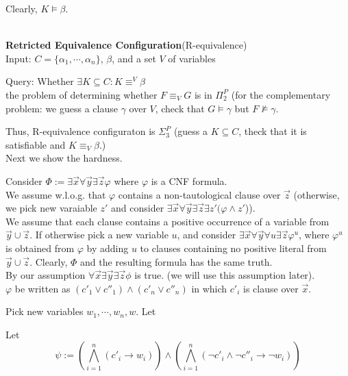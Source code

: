 \documentclass[12pt]{article}
\begin{document}
Clearly, $K\models\beta$. 




\ \\

{\bf Retricted Equivalence Configuration}(R-equivalence)\\

Input: $C=\{\alpha_1,\cdots,\alpha_n\}$, $\beta$, and a set $V$ of variables

Query: Whether $\exists K\subseteq C: K\equiv^V \beta$\\ 



the problem of determining whether $F\equiv_V G$  is in $\Pi_2^P$ (for the complementary problem: we guess a clause $\gamma$ over $V$, check that $G\models \gamma$ but $F\not\models \gamma$. 

Thus, R-equivalence configuraton is $\Sigma_3^P$ (guess a $K\subseteq C$, theck that it is satisfiable and $K\equiv_V \beta$.) \\


Next we show the hardness.

Consider $\Phi:=\exists \vec{x}\forall\vec{y}\exists \vec{z} \varphi$ where $\varphi$ is a CNF formula. \\

We assume w.l.o.g. that $\varphi$ contains a non-tautological clause over $\vec{z}$ (otherwise, we pick new varaiable $z'$ and consider $\exists\vec{x}\forall\vec{y}\exists\vec{z}\exists z'(\varphi\wedge z'$)).\\

We assume that each clause contains a positive occurrence of a variable from $\vec{y}\cup\vec{z}$. If otherwise pick a new variable $u$, and consider $\exists \vec{x}\forall\vec{y}\forall u\exists \vec{z}\varphi^u$, where $\varphi^u$ is obtained from $\varphi$ by adding $u$ to clauses containing no positive literal from $\vec{y}\cup\vec{z}$. Clearly, $\Phi$ and the resulting formula has the same truth.\\

By our assumption $\forall\vec{x}\exists\vec{y}\exists\vec{z}\phi$ is true. (we will use this assumption later).\\ 

$\varphi$ be written as $(c'_1\vee c''_1)\wedge (c'_n\vee c''_n)$ in which $c'_i$ is clause over $\vec{x}$.

Pick new variables $w_1, \cdots, w_n,w$. Let 

Let $$\psi:= \left(\bigwedge_{i=1}^n (c'_i\rightarrow w_i)\right)\wedge 
\left(\bigwedge_{i=1}^n(\neg c'_i\wedge \neg c''_i\rightarrow \neg w_i)\right)$$
\end{document}
